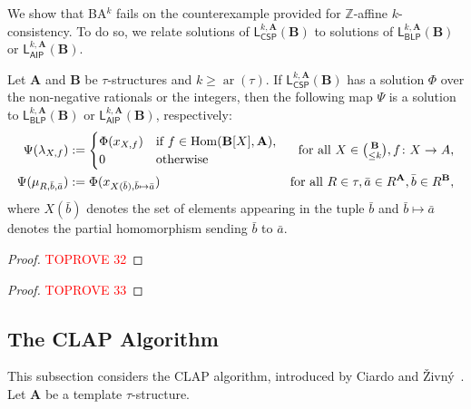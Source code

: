 \documentclass[a4paper,english, thm-restate]{lipics-v2021}
\newcommand{\ZZ}{\mathbb{Z}}
\newcommand{\tup}[1]{\bar{#1}}
\newcommand{\sig}{\tau}
\newcommand{\arity}[1]{\operatorname*{ar}(#1)}
\newcommand{\StructA}{\mathbf{A}}
\newcommand{\StructB}{\mathbf{B}}
\newcommand{\Hom}[2]{\mathrm{Hom}(#1,#2)}
\newcommand{\leqs}{\mathsf{L}}
\newcommand{\cspiso}[3]{\leqs^{#1,#2}_{\mathsf{CSP}}(#3)}
\newcommand{\blk}[3]{\leqs^{#1,#2}_{\mathsf{BLP}} (#3)}
\newcommand{\aipk}[3]{\leqs^{#1,#2}_{\mathsf{AIP}} (#3)}
\begin{document}
	
	
	We show that BA$^k$ fails on the counterexample provided for $\ZZ$-affine $k$-consistency.
	To do so, we relate solutions of $\cspiso{k}{\StructA}{\StructB}$ 
	to solutions of $\blk{k}{\StructA}{\StructB}$ or $\aipk{k}{\StructA}{\StructB}$.
	
	\begin{lemma}\label{lem:cspiso-implies-aip}
		Let $\StructA$ and $\StructB$ be $\sig$-structures and $k \geq \arity{\sig}$.
		If $\cspiso{k}{\StructA}{\StructB}$ has a solution $\Phi$
		over the non-negative rationals or the integers, then the following map $\Psi$ is a solution to $\blk{k}{\StructA}{\StructB}$ or $\aipk{k}{\StructA}{\StructB}$, respectively:
		\begin{align*}
			\Psi(\lambda_{X,f}) &:= \begin{cases}
				\Phi(x_{X,f}) &\text{if } f\in \Hom{\StructB[X]}{\StructA},\\
				0 &\text{otherwise}
			\end{cases} & \text{for all } X \in \tbinom{\StructB}{\leq k}, f \colon X \to A,\\
			\Psi(\mu_{R,\tup{b},\tup{a}}) &:= \Phi (x_{X(\tup{b}), \tup{b} \mapsto \tup{a}}) & \text{for all } R \in \sig, \tup{a} \in R^\StructA, \tup{b} \in R^\StructB,
		\end{align*}
		where $X(\tup{b})$ denotes the set of elements appearing in the tuple $\tup{b}$ and $\tup{b} \mapsto \tup{a}$ denotes the partial homomorphism sending $\tup{b}$ to $\tup{a}$. 
	\end{lemma}
	\begin{proof}\textcolor{red}{TOPROVE 32}\end{proof}
	
	
	\BLPDoesNotSolveBoundedColorClass*
	\begin{proof}\textcolor{red}{TOPROVE 33}\end{proof}
	
	
	\subsection{The CLAP Algorithm}
	\label{app:CLAP}
	This subsection considers the CLAP algorithm, introduced by Ciardo and Živný~\cite{CiardoZivny2023CLAP}.
	Let $\StructA$ be a template $\sig$-structure.
	
\end{document}
